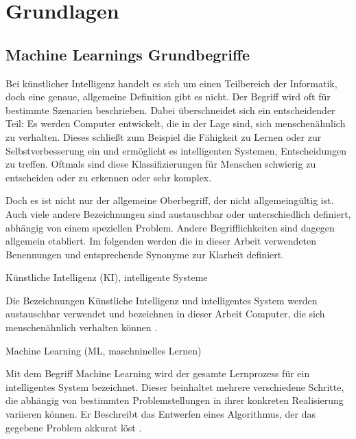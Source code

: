 \chapter{Grundlagen}
\label{chapter: kap2}

\section{Machine Learnings Grundbegriffe}
\label{section: Basics}
Bei künstlicher Intelligenz handelt es sich um einen Teilbereich der Informatik, doch eine genaue, allgemeine Definition gibt es nicht. Der Begriff wird oft für bestimmte Szenarien beschrieben. Dabei überschneidet sich ein entscheidender Teil: Es werden Computer entwickelt, die in der Lage sind, sich menschenähnlich zu verhalten. Dieses schließt zum Beispiel die Fähigkeit zu Lernen oder zur Selbstverbesserung ein \cite{}  und ermöglicht es intelligenten Systemen, Entscheidungen zu treffen. Oftmals sind diese Klassifizierungen für Menschen schwierig zu entscheiden oder zu erkennen oder sehr komplex.

Doch es ist nicht nur der allgemeine Oberbegriff, der nicht allgemeingültig ist. Auch viele andere Bezeichnungen sind austauschbar oder unterschiedlich definiert, abhängig von einem speziellen Problem. Andere Begrifflichkeiten sind dagegen allgemein etabliert. Im folgenden werden die in dieser Arbeit verwendeten Benennungen und entsprechende Synonyme zur Klarheit definiert.

\begin{definition}
	\label{def: KI}
	Künstliche Intelligenz (KI), intelligente Systeme
	
	Die Bezeichnungen Künstliche Intelligenz und intelligentes System werden austauschbar verwendet und bezeichnen in dieser Arbeit Computer, die sich menschenähnlich verhalten können \cite{}.
\end{definition}

\begin{definition}
	\label{def: ML}
	Machine Learning (ML, maschninelles Lernen)
	
	Mit dem Begriff Machine Learning wird der gesamte Lernprozess für ein intelligentes System bezeichnet. Dieser beinhaltet mehrere verschiedene Schritte, die abhängig von bestimmten Problemstellungen in ihrer konkreten Realisierung variieren können. Er Beschreibt das Entwerfen eines Algorithmus, der das gegebene Problem akkurat löst \cite{Basics-ML, Basics-ML2, Basics-ML-Blog}.
\end{definition}

